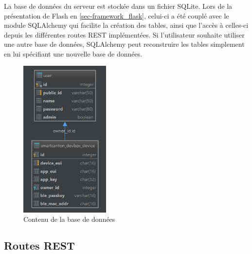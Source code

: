 La base de données du serveur est stockée dans un fichier SQLite. Lors de la présentation de Flash en  \cref{sec-framework_flask}, celui-ci a été couplé avec le module SQLAlchemy qui facilite la création des tables, ainsi que l'accès à celles-ci depuis les différentes routes REST implémentées. Si l'utilisateur souhaite utiliser une autre base de données, SQLAlchemy peut reconstruire les tables simplement en lui spécifiant une nouvelle base de données. 

\begin{figure}[ht!]
    \centering
    \includegraphics[width=0.4\textwidth]{Figures/Appendixes/database_model.PNG}
    \caption{Contenu de la base de données}
    \label{fig-database_model}
\end{figure}

\subsection{Routes REST}
\label{sec-software_serv_routes}

